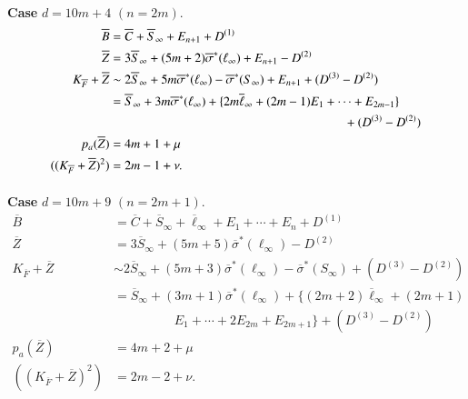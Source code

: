 \paragraph{}\label{chap3:3.5.4.1}
{\bf Case} $d=10m+4$ $(n=2m)$.
\begin{align*}
\overline{B} &= \overline{C}+\overline{S}_{\infty}+E_{n+1}+D^{(1)}\\
\overline{Z} &=
3\overline{S}_{\infty}+(5m+2)\overline{\sigma}^{\ast}(\ell_{\infty})+E_{n+1}-D^{(2)}\\
K_{\overline{F}}+\overline{Z} &\sim
2\overline{S}_{\infty}+5m\overline{\sigma}^{\ast}(\ell_{\infty})-\overline{\sigma}^{\ast}(S_{\infty})+E_{n+1}+(D^{(3)}-D^{(2)})\\
&=\overline{S}_{\infty} + 3m\overline{\sigma}^{\ast} (\ell_{\infty}) +
\{2m\overline{\ell}_{\infty}+(2m-1)E_{1}+\cdots+E_{2m-1}\}\\ 
& \hspace{6.5cm}+(D^{(3)}-D^{(2)})\\
p_{a}(\overline{Z}) &= 4m+1+\mu\\
((K_{\overline{F}}+\overline{Z})^{2}) &= 2m-1+\nu.
\end{align*}

\paragraph{}\label{chap3:3.5.4.2}
{\bf Case} $d=10m+9$ $(n=2m+1)$.
\begin{align*}
\overline{B} &=
\overline{C}+\overline{S}_{\infty}+\overline{\ell}_{\infty}+E_{1}+\cdots+E_{n}+D^{(1)}\\
\overline{Z} &=
3\overline{S}_{\infty}+(5m+5)\overline{\sigma}^{\ast}(\ell_{\infty})-D^{(2)}\\
K_{\overline{F}}+\overline{Z} &\sim
2\overline{S}_{\infty}+(5m+3)\overline{\sigma}^{\ast}(\ell_{\infty})-\overline{\sigma}^{\ast}(S_{\infty})+(D^{(3)}-D^{(2)})\\
&= \overline{S}_{\infty} + (3m+1)\overline{\sigma}^{\ast}
(\ell_{\infty}) + \Big\{(2m+2) \overline{\ell}_{\infty} + (2m+1)\\ 
& \hspace{2cm} E_{1}+ \cdots+ 2E_{2m}+ E_{2m+1}\Big\}+(D^{(3)}-D^{(2)})\\
p_{a}(\overline{Z}) &= 4m+2+\mu\\
((K_{\overline{F}}+\overline{Z})^{2}) &= 2m-2+\nu.
\end{align*}

